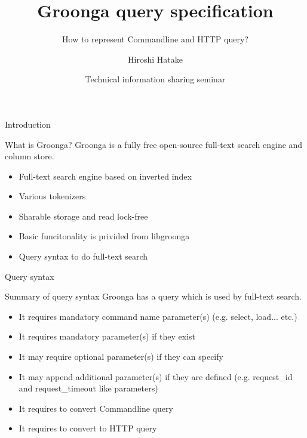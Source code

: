 \documentclass[12pt, unicode]{beamer}
\title{Groonga query specification}
\subtitle{How to represent Commandline and HTTP query?}
\author{Hiroshi Hatake}
\date[2016/03/12]{Technical information sharing seminar}
\begin{document}
\frame{\maketitle}

\begin{frame}{Introduction}
\begin{block}{What is Groonga?}
Groonga is a fully free open-source full-text search engine and column store.
\end{block}
\begin{itemize}
\item<2-> Full-text search engine based on inverted index
\item<3-> Various tokenizers
\item<4-> Sharable storage and read lock-free
\item<5-> Basic funcitonality is privided from libgroonga
\item<6-> Query syntax to do full-text search
\end{itemize}
\end{frame}

\begin{frame}{Query syntax}
\begin{block}{Summary of query syntax}
Groonga has a query which is used by full-text search.
\end{block}
\begin{itemize}
\item<2-> It requires mandatory command name parameter(s) (e.g. select, load... etc.)
\item<3-> It requires mandatory parameter(s) if they exist
\item<4-> It may require optional parameter(s) if they can specify
\item<5-> It may append additional parameter(s) if they are defined (e.g. request\_id and request\_timeout like parameters)
\item<6-> It requires to convert Commandline query
\item<7-> It requires to convert to HTTP query
\end{itemize}
\end{frame}
\end{document}
